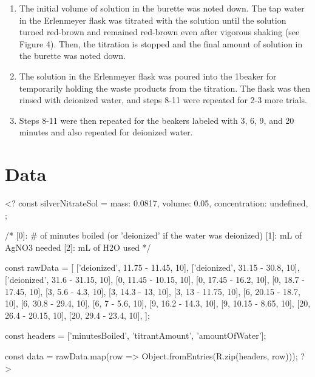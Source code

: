 \documentclass[11pt]{article}
\begin{document}
\begin{enumerate}
	\item The initial volume of  solution in the burette was noted down. The tap water in the Erlenmeyer flask was titrated with the  solution until the solution turned red-brown and remained red-brown even after vigorous shaking (see Figure 4). Then, the titration is stopped and the final amount of  solution in the burette was noted down.

	\item The solution in the Erlenmeyer flask was poured into the 1\litre beaker for temporarily holding the waste products from the titration. The flask was then rinsed with deionized water, and steps 8-11 were repeated for 2-3 more trials.

	\item Steps 8-11 were then repeated for the beakers labeled with 3, 6, 9, and 20 minutes and also repeated for deionized water.
\end{enumerate}

\section{Data}

<?
const silverNitrateSol = {
	mass: 0.0817,
	volume: 0.05,
	concentration: undefined,
};

/*
[0]: # of minutes boiled (or 'deionized' if the water was deionized)
[1]: mL of AgNO3 needed
[2]: mL of H2O used
*/

const rawData = [
	['deionized', 11.75 - 11.45, 10],
	['deionized', 31.15 - 30.8, 10],
	['deionized', 31.6 - 31.15, 10],
	[0, 11.45 - 10.15, 10],
	[0, 17.45 - 16.2, 10],
	[0, 18.7 - 17.45, 10],
	[3, 5.6 - 4.3, 10],
	[3, 14.3 - 13, 10],
	[3, 13 - 11.75, 10],
	[6, 20.15 - 18.7, 10],
	[6, 30.8 - 29.4, 10],
	[6, 7 - 5.6, 10],
	[9, 16.2 - 14.3, 10],
	[9, 10.15 - 8.65, 10],
	[20, 26.4 - 20.15, 10],
	[20, 29.4 - 23.4, 10],
];

const headers = ['minutesBoiled', 'titrantAmount', 'amountOfWater'];

const data = rawData.map(row => Object.fromEntries(R.zip(headers, row)));
?>
\end{document}
